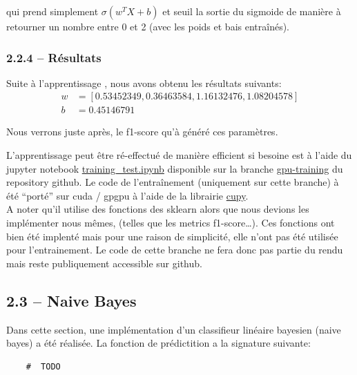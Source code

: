 \documentclass[
]{article}
\begin{document}
qui prend simplement \(\sigma(w^T X + b)\) et seuil la sortie du
sigmoide de manière à retourner un nombre entre 0 et 2 (avec les poids
et bais entraînés).

\newpage{}

\hypertarget{ruxe9sultats}{%
\subsubsection{2.2.4 -- Résultats}\label{ruxe9sultats}}

Suite à l'apprentissage , nous avons obtenu les résultats suivants:
\begin{align*}
    w &= [0.53452349, 0.36463584, 1.16132476, 1.08204578]\\
    b &= 0.45146791
\end{align*}

Nous verrons juste après, le f1-score qu'à généré ces paramètres.

L'apprentissage peut être ré-effectué de manière efficient si besoine
est à l'aide du jupyter notebook
\href{https://github.com/David-Kyrat/13X005-AI-Project/blob/gpu-training/training_test.ipynb}{training\_test.ipynb}
disponible sur la branche
\href{https://github.com/David-Kyrat/13X005-AI-Project/blob/gpu-training/training_test.ipynb}{gpu-training}
du repository github. Le code de l'entraînement (uniquement sur cette
branche) à été ``porté'' sur cuda / gpgpu à l'aide de la librairie
\href{https://cupy.dev}{cupy}.\\
A noter qu'il utilise des fonctions des sklearn alors que nous devions
les implémenter nous mêmes, (telles que les metrics f1-score\ldots). Ces
fonctions ont bien été implenté mais pour une raison de simplicité, elle
n'ont pas été utilisée pour l'entrainement. Le code de cette branche ne
fera donc pas partie du rendu mais reste publiquement accessible sur
github.

\newpage{}

\hypertarget{naive-bayes-1}{%
\subsection{2.3 -- Naive Bayes}\label{naive-bayes-1}}

Dans cette section, une implémentation d'un classifieur linéaire
bayesien (naive bayes) a été réalisée. La fonction de prédictition a la
signature suivante:

\begin{lstlisting}
    #  TODO
\end{lstlisting}
\end{document}

